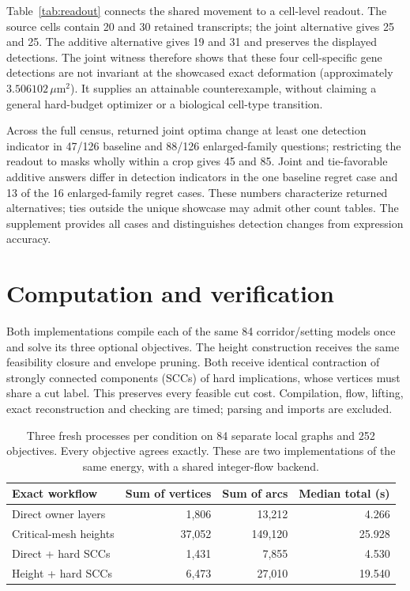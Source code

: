 \documentclass[10pt,letterpaper]{article}
\begin{document}
Table~\ref{tab:readout} connects the shared movement to a cell-level readout. The source cells contain 20 and 30 retained transcripts; the joint alternative gives 25 and 25. The additive alternative gives 19 and 31 and preserves the displayed detections. The joint witness therefore shows that these four cell-specific gene detections are not invariant at the showcased exact deformation (approximately $3.506102\,\mu$m$^2$). It supplies an attainable counterexample, without claiming a general hard-budget optimizer or a biological cell-type transition.

Across the full census, returned joint optima change at least one detection indicator in 47/126 baseline and 88/126 enlarged-family questions; restricting the readout to masks wholly within a crop gives 45 and 85. Joint and tie-favorable additive answers differ in detection indicators in the one baseline regret case and 13 of the 16 enlarged-family regret cases. These numbers characterize returned alternatives; ties outside the unique showcase may admit other count tables. The supplement provides all cases and distinguishes detection changes from expression accuracy.

\section{Computation and verification}\label{sec:resources}
Both implementations compile each of the same 84 corridor/setting models once and solve its three optional objectives. The height construction receives the same feasibility closure and envelope pruning. Both receive identical contraction of strongly connected components (SCCs) of hard implications, whose vertices must share a cut label. This preserves every feasible cut cost. Compilation, flow, lifting, exact reconstruction and checking are timed; parsing and imports are excluded.

\begin{table}[t]\centering
\begin{tabular}{lrrr}\toprule
Exact workflow & Sum of vertices & Sum of arcs & Median total (s)\\\midrule
Direct owner layers &1,806&13,212&4.266\\
Critical-mesh heights &37,052&149,120&25.928\\
Direct + hard SCCs &1,431&7,855&4.530\\
Height + hard SCCs &6,473&27,010&19.540\\\bottomrule
\end{tabular}
\caption{Three fresh processes per condition on 84 separate local graphs and 252 objectives. Every objective agrees exactly. These are two implementations of the same energy, with a shared integer-flow backend.}\label{tab:optional_runtime}
\end{table}
\end{document}
